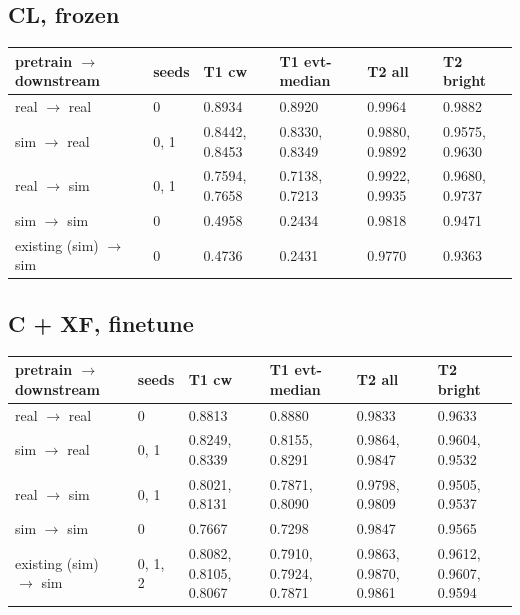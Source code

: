 \documentclass[10pt,a4paper]{article}
\begin{document}
\subsection{CL, frozen}
\begin{center}\footnotesize
\setlength{\tabcolsep}{3pt}\renewcommand{\arraystretch}{1.15}
\begin{tabularx}{\linewidth}{LLLLLL}
\toprule
\textbf{pretrain $\rightarrow$ downstream} & \textbf{seeds} & \textbf{T1 cw} & \textbf{T1 evt-median} & \textbf{T2 all} & \textbf{T2 bright} \\
\midrule
real $\rightarrow$ real & 0 & 0.8934 & 0.8920 & 0.9964 & 0.9882 \\
sim $\rightarrow$ real & 0, 1 & 0.8442, 0.8453 & 0.8330, 0.8349 & 0.9880, 0.9892 & 0.9575, 0.9630 \\
real $\rightarrow$ sim & 0, 1 & 0.7594, 0.7658 & 0.7138, 0.7213 & 0.9922, 0.9935 & 0.9680, 0.9737 \\
sim $\rightarrow$ sim & 0 & 0.4958 & 0.2434 & 0.9818 & 0.9471 \\
existing (sim) $\rightarrow$ sim & 0 & 0.4736 & 0.2431 & 0.9770 & 0.9363 \\
\bottomrule
\end{tabularx}
\end{center}
\subsection{C + XF, finetune}
\begin{center}\footnotesize
\setlength{\tabcolsep}{3pt}\renewcommand{\arraystretch}{1.15}
\begin{tabularx}{\linewidth}{LLLLLL}
\toprule
\textbf{pretrain $\rightarrow$ downstream} & \textbf{seeds} & \textbf{T1 cw} & \textbf{T1 evt-median} & \textbf{T2 all} & \textbf{T2 bright} \\
\midrule
real $\rightarrow$ real & 0 & 0.8813 & 0.8880 & 0.9833 & 0.9633 \\
sim $\rightarrow$ real & 0, 1 & 0.8249, 0.8339 & 0.8155, 0.8291 & 0.9864, 0.9847 & 0.9604, 0.9532 \\
real $\rightarrow$ sim & 0, 1 & 0.8021, 0.8131 & 0.7871, 0.8090 & 0.9798, 0.9809 & 0.9505, 0.9537 \\
sim $\rightarrow$ sim & 0 & 0.7667 & 0.7298 & 0.9847 & 0.9565 \\
existing (sim) $\rightarrow$ sim & 0, 1, 2 & 0.8082, 0.8105, 0.8067 & 0.7910, 0.7924, 0.7871 & 0.9863, 0.9870, 0.9861 & 0.9612, 0.9607, 0.9594 \\
\bottomrule
\end{tabularx}
\end{center}
\end{document}
